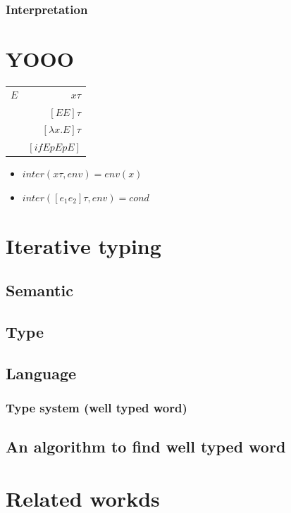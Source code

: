 \documentclass[a4paper]{report}
\begin{document}
\subsection{Interpretation}


\chapter{YOOO}

\begin{tabular}{|l|r| }
\hline
$E$ & $x \tau$\\
& $[E E] \tau$\\
& $[\lambda x.E]\tau$\\
& $[if E p E p E]$\\
\hline
\end{tabular}

\begin{itemize}
\item $inter(x\tau,env)=env(x)$
\item $inter([e_1 e_2]\tau,env)=cond $
\end{itemize}

\chapter{Iterative typing}

\section{Semantic}

\section{Type}

\section{Language}
\subsection{Type system (well typed word)}


\section{An algorithm to find well typed word}

\chapter{Related workds}
\end{document}
